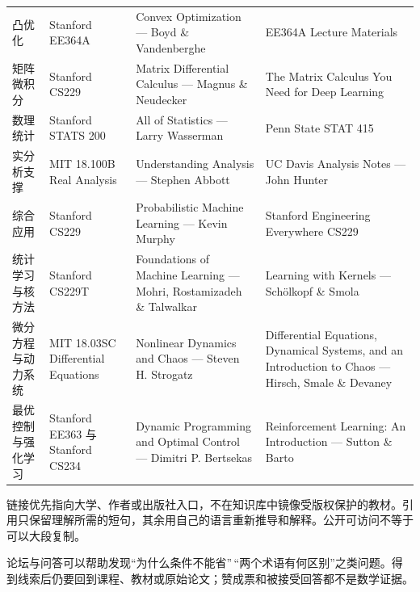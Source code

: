 {\begin{longtable}{@{}>{\raggedright\arraybackslash}p{2.2cm}>{\raggedright\arraybackslash}p{4cm}>{\raggedright\arraybackslash}p{4cm}>{\raggedright\arraybackslash}p{4cm}@{}}
凸优化 & Stanford EE364A & Convex Optimization --- Boyd \& Vandenberghe & EE364A Lecture Materials \\
矩阵微积分 & Stanford CS229 & Matrix Differential Calculus --- Magnus \& Neudecker & The Matrix Calculus You Need for Deep Learning \\
数理统计 & Stanford STATS 200 & All of Statistics --- Larry Wasserman & Penn State STAT 415 \\
实分析支撑 & MIT 18.100B Real Analysis & Understanding Analysis --- Stephen Abbott & UC Davis Analysis Notes --- John Hunter \\
综合应用 & Stanford CS229 & Probabilistic Machine Learning --- Kevin Murphy & Stanford Engineering Everywhere CS229 \\
统计学习与核方法 & Stanford CS229T & Foundations of Machine Learning --- Mohri, Rostamizadeh \& Talwalkar & Learning with Kernels --- Schölkopf \& Smola \\
微分方程与动力系统 & MIT 18.03SC Differential Equations & Nonlinear Dynamics and Chaos --- Steven H. Strogatz & Differential Equations, Dynamical Systems, and an Introduction to Chaos --- Hirsch, Smale \& Devaney \\
最优控制与强化学习 & Stanford EE363 与 Stanford CS234 & Dynamic Programming and Optimal Control --- Dimitri P. Bertsekas & Reinforcement Learning: An Introduction --- Sutton \& Barto \\
\end{longtable}
}

链接优先指向大学、作者或出版社入口，不在知识库中镜像受版权保护的教材。引用只保留理解所需的短句，其余用自己的语言重新推导和解释。公开可访问不等于可以大段复制。

论坛与问答可以帮助发现``为什么条件不能省''\,``两个术语有何区别''之类问题。得到线索后仍要回到课程、教材或原始论文；赞成票和被接受回答都不是数学证据。
